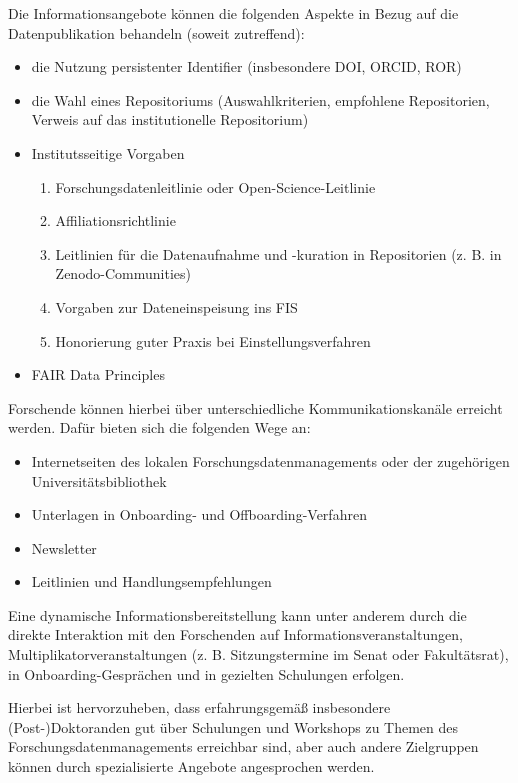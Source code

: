 \documentclass[
  ngerman,
  letterpaper,
  DIV=11]{scrreprt}
\providecommand{\tightlist}{%
  \setlength{\itemsep}{0pt}\setlength{\parskip}{0pt}}
\begin{document}
Die Informationsangebote können die folgenden Aspekte in Bezug auf die
Datenpublikation behandeln (soweit zutreffend):

\begin{itemize}
\tightlist
\item
  die Nutzung persistenter Identifier (insbesondere DOI, ORCID, ROR)
\item
  die Wahl eines Repositoriums (Auswahlkriterien, empfohlene
  Repositorien, Verweis auf das institutionelle Repositorium)
\item
  Institutsseitige Vorgaben

  \begin{enumerate}
  \def\labelenumi{\arabic{enumi}.}
  \tightlist
  \item
    Forschungsdatenleitlinie oder Open-Science-Leitlinie
  \item
    Affiliationsrichtlinie
  \item
    Leitlinien für die Datenaufnahme und -kuration in Repositorien (z.
    B. in Zenodo-Communities)
  \item
    Vorgaben zur Dateneinspeisung ins FIS
  \item
    Honorierung guter Praxis bei Einstellungsverfahren
  \end{enumerate}
\item
  FAIR Data Principles
\end{itemize}

Forschende können hierbei über unterschiedliche Kommunikationskanäle
erreicht werden. Dafür bieten sich die folgenden Wege an:

\begin{itemize}
\tightlist
\item
  Internetseiten des lokalen Forschungsdatenmanagements oder der
  zugehörigen Universitätsbibliothek
\item
  Unterlagen in Onboarding- und Offboarding-Verfahren
\item
  Newsletter
\item
  Leitlinien und Handlungsempfehlungen
\end{itemize}

Eine dynamische Informationsbereitstellung kann unter anderem durch die
direkte Interaktion mit den Forschenden auf Informationsveranstaltungen,
Multiplikatorveranstaltungen (z. B. Sitzungstermine im Senat oder
Fakultätsrat), in Onboarding-Gesprächen und in gezielten Schulungen
erfolgen.

Hierbei ist hervorzuheben, dass erfahrungsgemäß insbesondere
(Post-)Doktoranden gut über Schulungen und Workshops zu Themen des
Forschungsdatenmanagements erreichbar sind, aber auch andere Zielgruppen
können durch spezialisierte Angebote angesprochen werden.
\end{document}
